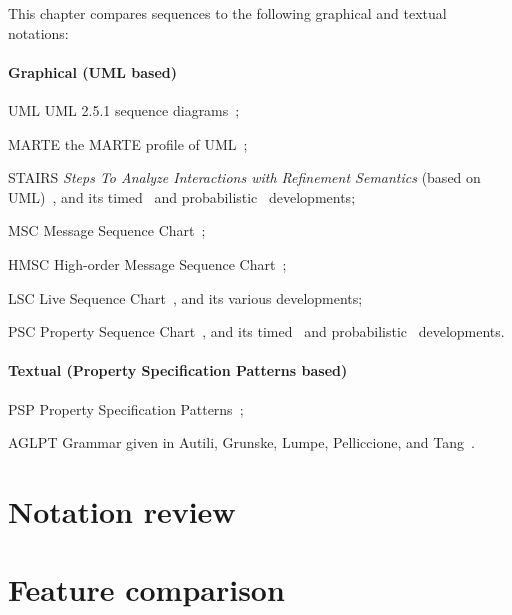
This chapter compares \langname{} sequences to the following graphical
and textual notations:

\newcommand{\featname}[1]{\textsf{#1}}

\paragraph{Graphical (UML based)}

\begin{featset}
\item[UML] UML 2.5.1 sequence diagrams~\cite{uml251};
\item[MARTE] the MARTE profile of UML~\cite{marte12};
\item[STAIRS] \emph{Steps To Analyze Interactions with Refinement Semantics} (based on UML)~\cite{Haugen03-STAIRS},
and its timed~\cite{Haugen05-TimedSTAIRS} and
probabilistic~\cite{Refsdal05-ProbabilisticSTAIRS} developments;
\item[MSC] Message Sequence Chart~\cite{Harel03-MSC};
\item[HMSC] High-order Message Sequence Chart~\cite{Harel03-MSC};
\item[LSC] Live Sequence Chart~\cite{lsc}, and its
various developments;
\item[PSC] Property Sequence Chart~\cite{psc}, and its
timed~\cite{tpsc} and probabilistic~\cite{ptpsc} developments.
\end{featset}

\paragraph{Textual (Property Specification Patterns based)}

\begin{featset}
\item[PSP] Property Specification Patterns~\cite{psp,pspsite};
\item[AGLPT] Grammar given in Autili, Grunske, Lumpe, Pelliccione, and Tang~\cite{aglpt}.
\end{featset}

\section{Notation review}\label{sec:seq-comparison-review}


\section{Feature comparison}\label{sec:seq-comparison-features}


